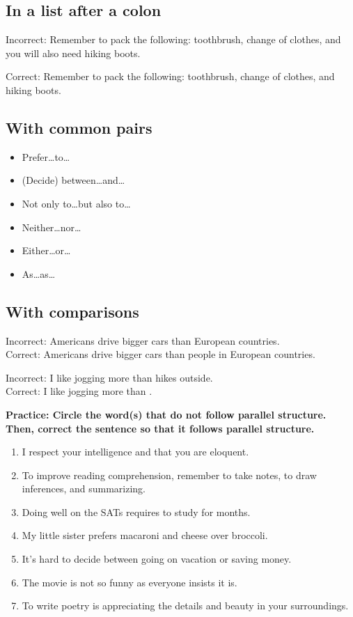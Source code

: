 \subsection{In a list after a colon}
Incorrect:  Remember to pack the following: toothbrush, change of clothes, and you will also need hiking boots.

\bigskip
Correct:  Remember to pack the following: toothbrush, change of clothes, and hiking boots.

\subsection{With common pairs}
\begin{itemize}
\item{Prefer\ldots to\ldots}
\item{(Decide) between\ldots and\ldots}
\item{Not only to\ldots but also to\ldots}
\item{Neither\ldots nor\ldots}
\item{Either\ldots or\ldots}
\item{As\ldots as\ldots}
\end{itemize}

\subsection{With comparisons}

Incorrect: Americans drive bigger cars than European countries.\\
Correct:  Americans drive bigger cars than people in European countries.

\bigskip
Incorrect:  I like jogging more than hikes outside.\\
Correct: I like jogging more than \hrulefill.

\bigskip
\textbf{Practice: Circle the word(s) that do not follow parallel structure. Then, correct the sentence so that it follows parallel structure.}

\begin{enumerate}
\item{I respect your intelligence and that you are eloquent.}
\item{To improve reading comprehension, remember to take notes, to draw inferences, and summarizing.}
\item{Doing well on the SATs requires to study for months.}
\item{My little sister prefers macaroni and cheese over broccoli.}
\item{It's hard to decide between going on vacation or saving money.}
\item{The movie is not so funny as everyone insists it is.}
\item{To write poetry is appreciating the details and beauty in your surroundings.}
\end{enumerate}

